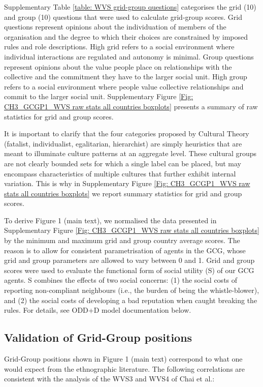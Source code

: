 \documentclass[12pt, a4paper]{article}
\begin{document}
Supplementary Table \ref{table: WVS grid-group questions} categorises the grid (10) and group (10) questions that were used to calculate grid-group scores. Grid questions represent opinions about the individuation of members of the organisation and the degree to which their choices are constrained by imposed rules and role descriptions. High grid refers to a social environment where individual interactions are regulated and autonomy is minimal. Group questions represent opinions about the value people place on relationships with the collective and the commitment they have to the larger social unit. High group refers to a social environment where people value collective relationships and commit to the larger social unit. Supplementary Figure \ref{Fig: CH3_GCGP1_WVS raw stats all countries boxplots} presents a summary of raw statistics for grid and group scores.

It is important to clarify that the four categories proposed by Cultural Theory (fatalist, individualist, egalitarian, hierarchist) are simply heuristics that are meant to illuminate culture patterns at an aggregate level. These cultural groups are not clearly bounded sets for which a single label can be placed, but may encompass characteristics of multiple cultures that further exhibit internal variation. This is why in Supplementary Figure \ref{Fig: CH3_GCGP1_WVS raw stats all countries boxplots} we report summary statistics for grid and group scores.

To derive Figure 1 (main text), we normalised the data presented in Supplementary Figure \ref{Fig: CH3_GCGP1_WVS raw stats all countries boxplots} by the minimum and maximum grid and group country average scores. The reason is to allow for consistent parametrisation of agents in the GCG, whose grid and group parameters are allowed to vary between 0 and 1. Grid and group scores were used to evaluate the functional form of social utility (S) of our GCG agents. S combines the effects of two social concerns: (1) the social costs of reporting non-compliant neighbours (i.e., the burden of being the whistle-blower), and (2) the social costs of developing a bad reputation when caught breaking the rules. For details, see ODD+D model documentation below.

\subsection{Validation of Grid-Group positions}

Grid-Group positions shown in Figure 1 (main text) correspond to what one would expect from the ethnographic literature. The following correlations are consistent with the analysis of the WVS3 and WVS4 of Chai et al.\autocite{Chai:2009vz}:
\end{document}
